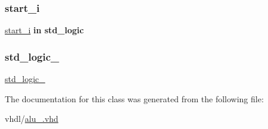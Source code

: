 \mbox{\label{classalu_aba7911228d421cdfd5fc4eb74a60572c}} 
\subsubsection{\texorpdfstring{start\+\_\+i}{start\_i}}
{\footnotesize\ttfamily \hyperlink{classalu_aba7911228d421cdfd5fc4eb74a60572c}{start\+\_\+i} {\bfseries \textcolor{keywordflow}{in}\textcolor{vhdlchar}{ }} {\bfseries \textcolor{comment}{std\+\_\+logic}\textcolor{vhdlchar}{ }} \hspace{0.3cm}{\ttfamily [Port]}}

\mbox{\label{classalu_acd03516902501cd1c7296a98e22c6fcb}} 
\subsubsection{\texorpdfstring{std\+\_\+logic\+\_}{std\_logic\_1164}}
{\footnotesize\ttfamily \hyperlink{classalu_acd03516902501cd1c7296a98e22c6fcb}{std\+\_\+logic\+\_}\hspace{0.3cm}{\ttfamily [Package]}}



The documentation for this class was generated from the following file\+:\begin{DoxyCompactItemize}
\item 
vhdl/\hyperlink{alu___8vhd}{alu\+\_\+.\+vhd}\end{DoxyCompactItemize}
